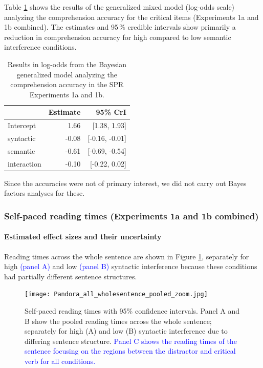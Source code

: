 \documentclass[review,preprint,12pt,authoryear,floatsintext]{elsarticle}
\begin{document}
Table \ref{tab:spr_acc_mod} shows the results of the generalized mixed model (log-odds scale) analyzing the comprehension accuracy for the critical items (Experiments 1a and 1b combined). The estimates and 95\,\% credible intervals show primarily a reduction in comprehension accuracy for high compared to low semantic interference conditions.

\begin{table}[ht]
    \caption{Results in log-odds from the Bayesian generalized model analyzing the comprehension accuracy in the SPR Experiments 1a and 1b.}
    \label{tab:spr_acc_mod}
    \centering
    \begin{tabular}{lrr}
    \toprule
    & Estimate &  95\% CrI  \\
    \midrule
Intercept& 1.66 &   [1.38, 1.93]\\
syntactic& -0.08 &  [-0.16, -0.01]\\
semantic&  -0.61 & [-0.69, -0.54]\\
interaction& -0.10&  [-0.22, 0.02]\\
    \bottomrule
    \end{tabular}
\end{table}

Since the accuracies were not of primary interest, we did not carry out Bayes factors analyses for these.

\subsubsection*{Self-paced reading times (Experiments 1a and 1b combined)}

\paragraph{Estimated effect sizes and their uncertainty}

Reading times across the whole sentence are shown in Figure \ref{fig:whole_sentence}, separately for high \textcolor{blue}{(panel A)} and low \textcolor{blue}{(panel B)} syntactic interference because these conditions had partially different sentence structures. 

\begin{figure}
    \caption{Self-paced reading times with 95\% confidence intervals. Panel A and B show the pooled reading times across the whole sentence; separately for high (A) and low (B) syntactic interference due to differing sentence structure. \textcolor{blue}{Panel C shows the reading times of the sentence focusing on the regions between the distractor and critical verb for all conditions.}}
    \label{fig:whole_sentence}
    \centering
    \texttt{[image: Pandora\_all\_wholesentence\_pooled\_zoom.jpg]}
\end{figure}
\clearpage
\end{document}

